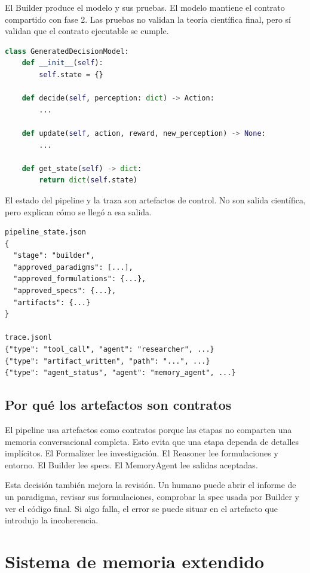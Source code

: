 El Builder produce el modelo y sus pruebas. El modelo mantiene el contrato
compartido con fase 2. Las pruebas no validan la teoría científica final, pero
sí validan que el contrato ejecutable se cumple.

\begin{lstlisting}[language=Python]
class GeneratedDecisionModel:
    def __init__(self):
        self.state = {}

    def decide(self, perception: dict) -> Action:
        ...

    def update(self, action, reward, new_perception) -> None:
        ...

    def get_state(self) -> dict:
        return dict(self.state)
\end{lstlisting}

El estado del pipeline y la traza son artefactos de control. No son salida
científica, pero explican cómo se llegó a esa salida.

\begin{lstlisting}
pipeline_state.json
{
  "stage": "builder",
  "approved_paradigms": [...],
  "approved_formulations": {...},
  "approved_specs": {...},
  "artifacts": {...}
}

trace.jsonl
{"type": "tool_call", "agent": "researcher", ...}
{"type": "artifact_written", "path": "...", ...}
{"type": "agent_status", "agent": "memory_agent", ...}
\end{lstlisting}

\subsection{Por qué los artefactos son contratos}

El pipeline usa artefactos como contratos porque las etapas no comparten una
memoria conversacional completa. Esto evita que una etapa dependa de detalles
implícitos. El Formalizer lee investigación. El Reasoner lee formulaciones y
entorno. El Builder lee specs. El MemoryAgent lee salidas aceptadas.

Esta decisión también mejora la revisión. Un humano puede abrir el informe de
un paradigma, revisar sus formulaciones, comprobar la spec usada por Builder y
ver el código final. Si algo falla, el error se puede situar en el artefacto
que introdujo la incoherencia.

\section{Sistema de memoria extendido}
\label{ap:memoria-extendida}

